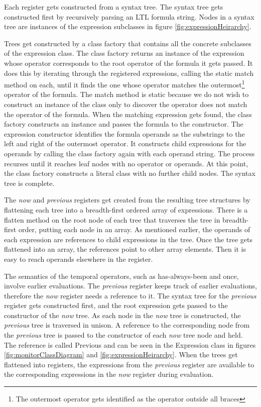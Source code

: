 Each register gets constructed from a syntax tree.  The syntax tree gets constructed first by recursively parsing an LTL formula string.  Nodes in a syntax tree are instances of the expression subclasses in figure \ref{fig:expressionHeirarchy}.

Trees get constructed by a class factory that contains all the concrete subclasses of the expression class.  The class factory returns an instance of the expression whose operator corresponds to the root operator of the formula it gets passed.  It does this by iterating through the registered expressions, calling the static match method on each, until it finds the one whose operator matches the outermost\footnote{The outermost operator gets identified as the operator outside all braces} operator of the formula.  The match method is static because we do not wish to construct an instance of the class only to discover the operator does not match the operator of the formula.  When the matching expression gets found, the class factory constructs an instance and passes the formula to the constructor.  The expression constructor identifies the formula operands as the substrings to the left and right of the outermost operator.  It constructs child expressions for the operands by calling the class factory again with each operand string.  The process recurses until it reaches leaf nodes with no operator or operands.  At this point, the class factory constructs a literal class with no further child nodes.  The syntax tree is complete.

The \textit{now} and \textit{previous} registers get created from the resulting tree structures by flattening each tree into a breadth-first ordered array of expressions.  There is a flatten method on the root node of each tree that traverses the tree in breadth-first order, putting each node in an array.  As mentioned earlier, the operands of each expression are references to child expressions in the tree.  Once the tree gets flattened into an array, the references point to other array elements.  Then it is easy to reach operands elsewhere in the register.

The semantics of the temporal operators, such as has-always-been and once, involve earlier evaluations.  The \textit{previous} register keeps track of earlier evaluations, therefore the \textit{now} register needs a reference to it.  The syntax tree for the \textit{previous} register gets constructed first, and the root expression gets passed to the constructor of the \textit{now} tree.  As each node in the \textit{now} tree is constructed, the \textit{previous} tree is traversed in unison.  A reference to the corresponding node from the \textit{previous} tree is passed to the constructor of each \textit{now} tree node and held.  The reference is called Previous and can be seen in the Expression class in figures \ref{fig:monitorClassDiagram} and \ref{fig:expressionHeirarchy}. When the trees get flattened into registers, the expressions from the \textit{previous} register are available to the corresponding expressions in the \textit{now} register during evaluation.

